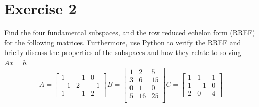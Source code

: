 \section{Exercise 2}
Find the four fundamental subspaces, and the row reduced echelon form
(RREF) for the following matrices. Furthermore, use Python to verify the
RREF and briefly discuss the properties of the subspaces and how they
relate to solving $Ax=b$.
\begin{subequations}                   
    \begin{equation}
        A = 
        \begin{bmatrix}
            1   &       -1      &   0       \\
            -1  &       2       &   -1      \\
            1   &       -1      &   2
        \end{bmatrix}
    \end{equation}
    \begin{equation}
        B = 
        \begin{bmatrix}
            1   &       2       &   5       \\
            3   &       6       &   15      \\
            0   &       1       &   0       \\
            5   &       16      &   25      \\
        \end{bmatrix}
    \end{equation}
    \begin{equation}
        C = 
        \begin{bmatrix}
            1   &       1       &   1       \\
            1   &       -1      &   0       \\
            2   &       0       &   4
        \end{bmatrix}
    \end{equation}
\end{subequations} 
